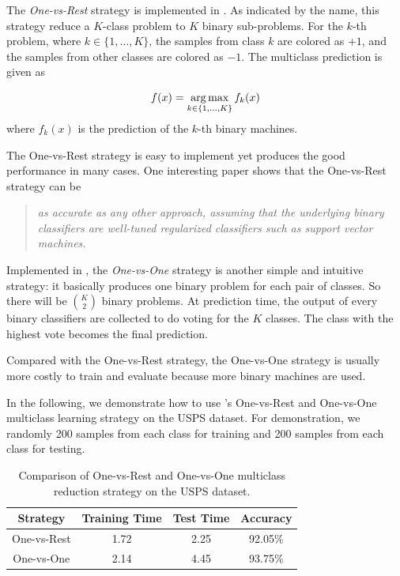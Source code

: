 The \emph{One-vs-Rest} strategy is implemented in
. As indicated by the name, this
strategy reduce a $K$-class problem to $K$ binary sub-problems. For the $k$-th
problem, where $k\in\{1,\ldots,K\}$, the samples from class $k$ are colored as
$+1$, and the samples from other classes are colored as $-1$. The multiclass
prediction is given as

\[
	f(x) = \operatorname*{arg\,max}_{k\in\{1,\ldots,K\}} f_k(x)
\]
where $f_k(x)$ is the prediction of the $k$-th binary machines.

The One-vs-Rest strategy is easy to implement yet produces the good performance
in many cases. One interesting paper \citep{OneVsRestDefense} shows that the
One-vs-Rest strategy can be

\begin{quote}
	\emph{as accurate as any other approach, assuming that the underlying binary
classifiers are well-tuned regularized classifiers such as support vector
machines.}
\end{quote}

Implemented in , the 
\emph{One-vs-One} strategy \citep{OneVsOne} is another simple and intuitive 
strategy: it basically produces one binary problem for each pair of classes.  
So there will be $\binom{K}{2}$ binary problems. At prediction time, the 
output of every binary classifiers are collected to do voting for the $K$ 
classes. The class with the highest vote becomes the final prediction.

Compared with the One-vs-Rest strategy, the One-vs-One strategy is usually more
costly to train and evaluate because more binary machines are used.

In the following, we demonstrate how to use \shogun{}'s One-vs-Rest and 
One-vs-One multiclass learning strategy on the USPS dataset.  For 
demonstration, we randomly 200 samples from each class for training and 200 
samples from each class for testing.

\begin{table}\centering
	\begin{tabular}{cccc}
	\toprule
	Strategy & Training Time & Test Time & Accuracy \\
	\midrule
	One-vs-Rest & 1.72       & 2.25      & 92.05\%  \\
	One-vs-One  & 2.14       & 4.45      & 93.75\%  \\
	\bottomrule
	\end{tabular}
	\caption{Comparison of One-vs-Rest and One-vs-One multiclass reduction
		strategy on the USPS dataset.}
	\label{tab:ovr-vs-ovo}
\end{table}


